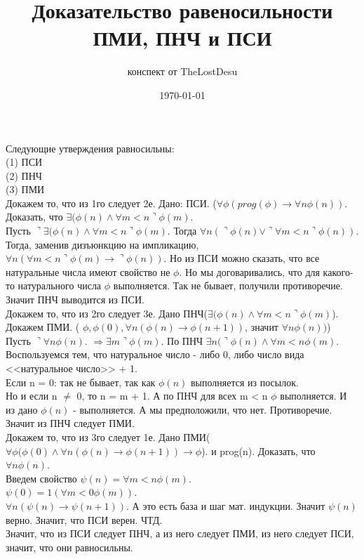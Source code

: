 \documentclass[a4paper,12pt]{article}
\author{конспект от TheLostDesu}
\title{Доказательство равеносильности ПМИ, ПНЧ и ПСИ}
\date{\today}
\begin{document}
\maketitle
Следующие утверждения равносильны:\\
(1) ПСИ\\
(2) ПНЧ\\
(3) ПМИ\\
Докажем то, что из 1го следует 2е. Дано: ПСИ. ($\forall \phi (prog(\phi) \rightarrow  \forall n \phi (n))$. Доказать, что $\exists (\phi (n) \wedge \forall m < n \urcorner \phi (m)$. \\
Пусть $\urcorner \exists (\phi (n) \wedge \forall m < n \urcorner \phi (m)$. Тогда $\forall n (\urcorner \phi (n) \vee \urcorner \forall m < n \urcorner \phi (n))$. Тогда, заменив дизъюнкцию на импликацию, $\forall n (\forall m < n \urcorner \phi(m) \rightarrow \urcorner \phi (n))$. Но из ПСИ можно сказать, что все натуральные числа имеют свойство не $\phi $. Но мы договаривались, что для какого-то натурального числа $\phi $ выполняется. Так не бывает, получили противоречие. Значит ПНЧ выводится из ПСИ.\\
Докажем то, что из 2го следует 3е. Дано ПНЧ($\exists (\phi (n) \wedge \forall m < n \urcorner \phi (m)$). Докажем ПМИ. ( $\phi , \phi (0), \forall n (\phi (n) \rightarrow \phi (n + 1))$, значит $\forall n \phi (n))$)\\
Пусть $\urcorner \forall n \phi(n)$. $\Rightarrow \exists m \urcorner \phi (m)$. По ПНЧ $\exists n(\urcorner \phi (n) \wedge \forall m < n \phi (m)$. Воспользуемся тем, что натуральное число - либо 0, либо число вида <<натуральное число>> + 1.\\
Если n = 0: так не бывает, так как $\phi (n)$ выполняется из посылок.	\\
Но и если n $\neq $ 0, то n = m + 1. А по ПНЧ для всех m < n $\phi $ выполняется. И из дано $\phi (n) $ - выполняется. А мы предположили, что нет. Противоречие. Значит из ПНЧ следует ПМИ.\\
Докажем то, что из 3го следует 1е. Дано ПМИ( $\forall \phi (\phi(0) \wedge \forall n (\phi (n) \rightarrow \phi (n + 1)) \rightarrow \phi$). и prog(n). Доказать, что $\forall n \phi (n)$.\\
Введем свойство $\psi (n) =  \forall m < n \phi (m)$.\\
$\psi (0) = 1 (\forall m < 0 \phi(m))$.\\
$ \forall n (\psi (n) \rightarrow \psi(n + 1))$.
А это есть база и шаг мат. индукции. Значит $\psi (n)$ верно. Значит, что ПСИ верен. ЧТД. \\
Значит, что из ПСИ следует ПНЧ, а из него следует ПМИ, из него следует ПСИ, значит, что они равносильны.
\end{document}
